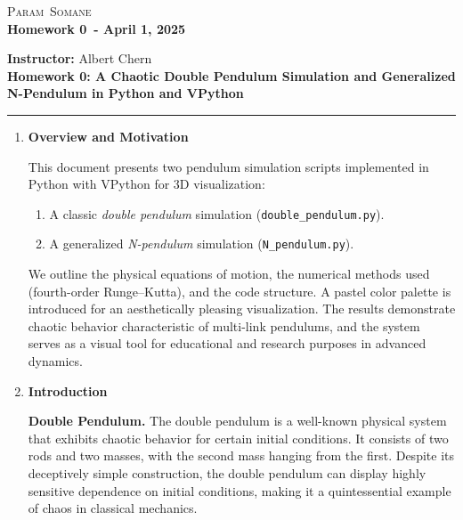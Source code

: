\documentclass[letterpaper,12pt]{article}
\newcommand{\myFirstName}{Param}
\newcommand{\myLastName}{Somane}
\def\homeworknum{0}
\def\duedate{April 1, 2025}
\begin{document}
\begin{center}
  {\color{darkgreen}\Large{\scshape \myFirstName \ \myLastName}} \\
  {\bf Homework \homeworknum\ - \duedate}
\end{center}

\vspace*{0.3cm}

\noindent
\textbf{Instructor:} Albert Chern \\
\textbf{Homework \homeworknum: A Chaotic Double Pendulum Simulation and Generalized N-Pendulum in Python and VPython}\\
\rule{\textwidth}{0.4pt}

\begin{enumerate}[leftmargin=*, itemsep=1em]

\item \textbf{Overview and Motivation}

This document presents two pendulum simulation scripts implemented in Python with VPython for 3D visualization:

\begin{enumerate}
    \item A classic \emph{double pendulum} simulation (\texttt{double\_pendulum.py}).
    \item A generalized \emph{N-pendulum} simulation (\texttt{N\_pendulum.py}).
\end{enumerate}

We outline the physical equations of motion, the numerical methods used (fourth-order Runge–Kutta), and the code structure. A pastel color palette is introduced for an aesthetically pleasing visualization. The results demonstrate chaotic behavior characteristic of multi-link pendulums, and the system serves as a visual tool for educational and research purposes in advanced dynamics.

\item \textbf{Introduction}

\textbf{Double Pendulum.} The double pendulum is a well-known physical system that exhibits chaotic behavior for certain initial conditions. It consists of two rods and two masses, with the second mass hanging from the first. Despite its deceptively simple construction, the double pendulum can display highly sensitive dependence on initial conditions, making it a quintessential example of chaos in classical mechanics.


\end{enumerate}
\end{document}
